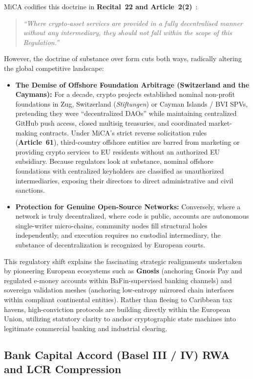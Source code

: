 \documentclass[a4paper,11pt,twoside,parskip=half-,headings=small]{scrartcl}
\begin{document}
MiCA codifies this doctrine in \textbf{Recital~22 and Article~2(2)}~\cite{mica2023}:
\begin{quote}
\emph{``Where crypto-asset services are provided in a fully decentralised manner without any intermediary, they should not fall within the scope of this Regulation.''}
\end{quote}
However, the doctrine of substance over form cuts both ways, radically altering the global competitive landscape:
\begin{itemize}
  \item \textbf{The Demise of Offshore Foundation Arbitrage (Switzerland and the Caymans):} For a decade, crypto projects established nominal non-profit foundations in Zug, Switzerland (\emph{Stiftungen}) or Cayman Islands / BVI SPVs, pretending they were ``decentralized DAOs'' while maintaining centralized GitHub push access, closed multisig treasuries, and coordinated market-making contracts. Under MiCA's strict reverse solicitation rules (\textbf{Article~61}), third-country offshore entities are barred from marketing or providing crypto services to EU residents without an authorized EU subsidiary. Because regulators look at substance, nominal offshore foundations with centralized keyholders are classified as unauthorized intermediaries, exposing their directors to direct administrative and civil sanctions.
  \item \textbf{Protection for Genuine Open-Source Networks:} Conversely, where a network is truly decentralized, where code is public, accounts are autonomous single-writer micro-chains, community nodes fill structural holes independently, and execution requires no custodial intermediary, the substance of decentralization is recognized by European courts.
\end{itemize}

This regulatory shift explains the fascinating strategic realignments undertaken by pioneering European ecosystems such as \textbf{Gnosis} (anchoring Gnosis Pay and regulated e-money accounts within BaFin-supervised banking channels) and sovereign validation meshes (anchoring low-entropy mirrored chain interfaces within compliant continental entities). Rather than fleeing to Caribbean tax havens, high-conviction protocols are building directly within the European Union, utilizing statutory clarity to anchor cryptographic state machines into legitimate commercial banking and industrial clearing.

\subsection{Bank Capital Accord (Basel III / IV) RWA and LCR Compression}
\label{sec:basel_relief}
\end{document}
